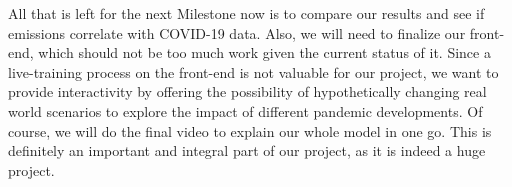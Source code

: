 \documentclass{article}
\newcommand{\co}{\text{CO\textsubscript{2} }}
\begin{document}
All that is left for the next Milestone now is to compare our results and see if \co emissions correlate with COVID-19 data. Also, we will need to finalize our front-end, which should not be too much work given the current status of it. Since a live-training process on the front-end is not valuable for our project, we want to provide interactivity by offering the possibility of hypothetically changing real world scenarios to explore the impact of different pandemic developments. Of course, we will do the final video to explain our whole model in one go. This is definitely an important and integral part of our project, as it is indeed a huge project.




\end{document}
